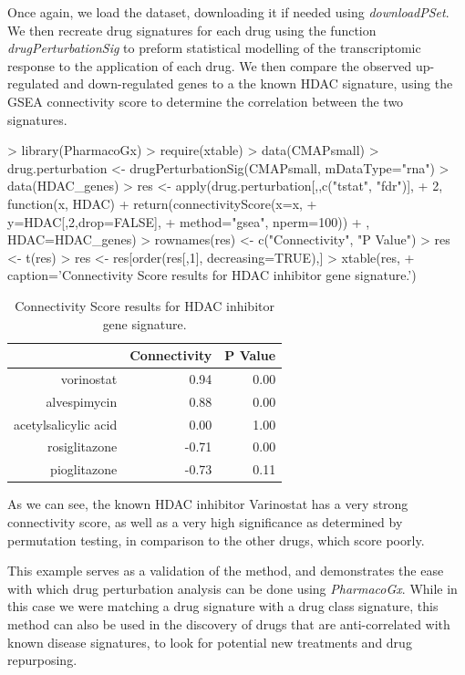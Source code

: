 \documentclass[11pt]{article}
\begin{document}
Once again, we load the dataset, downloading it if needed using \textit{downloadPSet}. We then recreate drug signatures for each drug using the function \textit{drugPerturbationSig} to preform statistical modelling of the transcriptomic response to the application of each drug. We then compare the observed up-regulated and down-regulated genes to a the known HDAC signature, using the GSEA connectivity score to determine the correlation between the two signatures. 

\begin{Schunk}
\begin{Sinput}
>   library(PharmacoGx)
>   require(xtable)
>   data(CMAPsmall)
>   drug.perturbation <- drugPerturbationSig(CMAPsmall, mDataType="rna")
>   data(HDAC_genes)
>   res <- apply(drug.perturbation[,,c("tstat", "fdr")],
+                2, function(x, HDAC){ 
+ 	    return(connectivityScore(x=x, 
+ 	                             y=HDAC[,2,drop=FALSE], 
+ 	                             method="gsea", nperm=100))
+ 	}, HDAC=HDAC_genes)
>   rownames(res) <- c("Connectivity", "P Value")
>   res <- t(res)
>   res <- res[order(res[,1], decreasing=TRUE),]
>   xtable(res, 
+     caption='Connectivity Score results for HDAC inhibitor gene signature.')
\end{Sinput}
\begin{table}[ht]
\centering
\begin{tabular}{rrr}
  \hline
 & Connectivity & P Value \\ 
  \hline
vorinostat & 0.94 & 0.00 \\ 
  alvespimycin & 0.88 & 0.00 \\ 
  acetylsalicylic acid & 0.00 & 1.00 \\ 
  rosiglitazone & -0.71 & 0.00 \\ 
  pioglitazone & -0.73 & 0.11 \\ 
   \hline
\end{tabular}
\caption{Connectivity Score results for HDAC inhibitor gene signature.} 
\end{table}\end{Schunk}
As we can see, the known HDAC inhibitor Varinostat has a very strong connectivity score, as well as a very high significance as determined by permutation testing, in comparison to the other drugs, which score poorly. 

This example serves as a validation of the method, and demonstrates the ease with which drug perturbation analysis can be done using \textit{PharmacoGx}. While in this case we were matching a drug signature with a drug class signature, this method can also be used in the discovery of drugs that are anti-correlated with known disease signatures, to look for potential new treatments and drug repurposing.
\end{document}
